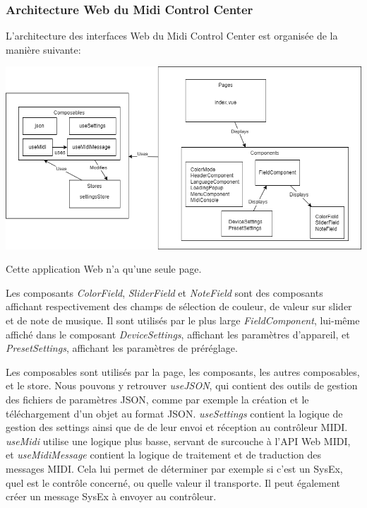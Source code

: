 \documentclass[francais]{rapportPFE}  %
\begin{document}
\subsubsection{Architecture Web du Midi Control Center}

L'architecture des interfaces Web du Midi Control Center est organisée de la manière suivante: 

\begin{center}
    \centering
    \includegraphics[width=15cm]{graphics/minilab3nuxt.png}
    \label{fig:test1}
\end{center}

Cette application Web n'a qu'une seule page.

Les composants \textit{ColorField}, \textit{SliderField} et \textit{NoteField} sont des composants affichant respectivement des champs de sélection de couleur, de valeur sur slider et de note de musique. Il sont utilisés par le plus large \textit{FieldComponent}, lui-même affiché dans le composant \textit{DeviceSettings}, affichant les paramètres d'appareil, et \textit{PresetSettings}, affichant les paramètres de préréglage.

Les composables sont utilisés par la page, les composants, les autres composables, et le store. Nous pouvons y retrouver \textit{useJSON}, qui contient des outils de gestion des fichiers de paramètres JSON, comme par exemple la création et le téléchargement d'un objet au format JSON. \textit{useSettings} contient la logique de gestion des settings ainsi que de de leur envoi et réception au contrôleur MIDI. \textit{useMidi} utilise une logique plus basse, servant de surcouche à l'API Web MIDI, et \textit{useMidiMessage} contient la logique de traitement et de traduction des messages MIDI. Cela lui permet de déterminer par exemple si c'est un SysEx, quel est le contrôle concerné, ou quelle valeur il transporte. Il peut également créer un message SysEx à envoyer au contrôleur.
\end{document}
